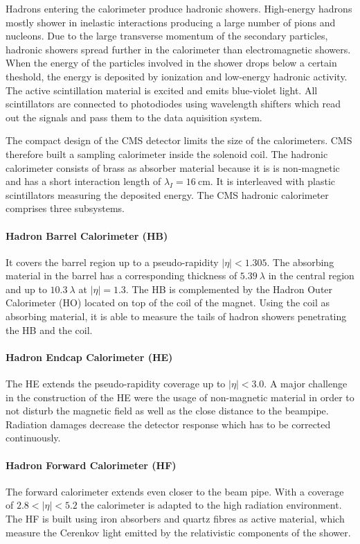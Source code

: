 Hadrons entering the calorimeter produce hadronic showers. High-energy
hadrons mostly shower in inelastic interactions producing a large number of pions
and nucleons. Due to the large transverse momentum of the secondary particles,
hadronic showers spread further in the calorimeter than electromagnetic showers.
When the energy of the particles involved in the shower drops below a certain
theshold, the energy is deposited by ionization and low-energy hadronic
activity. The active scintillation material is excited and emits blue-violet
light. All scintillators are connected to photodiodes using wavelength
shifters which read out the signals and pass them to the data aquisition system.

The compact design of the CMS detector limits the size of the calorimeters. CMS
therefore built a sampling calorimeter inside the solenoid coil. The hadronic
calorimeter consists of brass as absorber material because it is is non-magnetic and
has a short interaction length of $\lambda_I = \SI{16}{\centi\metre}$. It is
interleaved with plastic scintillators measuring the deposited energy. The CMS
hadronic calorimeter comprises three subsystems. 

\paragraph{Hadron Barrel Calorimeter (HB)}
It covers the barrel region up to a pseudo-rapidity $|\eta| < 1.305$. The
absorbing material in the barrel has a corresponding thickness of
$\SI{5.39}{\lambda}$ in the central region and up to $\SI{10.3}{\lambda}$ at $|\eta|
= 1.3$. The HB is complemented by the Hadron Outer Calorimeter (HO) located on
top of the coil of the magnet. Using the coil as absorbing material, it is able
to measure the tails of hadron showers penetrating the HB and the coil.

\paragraph{Hadron Endcap Calorimeter (HE)} The HE extends the pseudo-rapidity
coverage up to $|\eta| < 3.0$. A major challenge in the construction of the HE
were the usage of non-magnetic material in order to not disturb the magnetic field as
well as the close distance to the beampipe. Radiation damages decrease the
detector response which has to be corrected continuously. 

\paragraph{Hadron Forward Calorimeter (HF)} 
The forward calorimeter extends even closer to the beam pipe. With a coverage of
$2.8 < |\eta| < 5.2$ the calorimeter is adapted to the high radiation
environment. The HF is built using iron absorbers and quartz fibres as active
material, which measure the Cerenkov light emitted by the relativistic
components of the shower.

